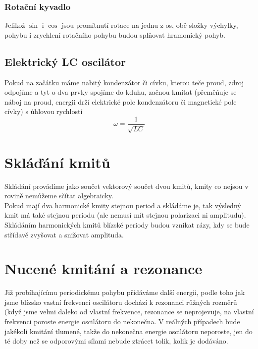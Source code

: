 \documentclass[titlepage]{book}
\begin{document}
\subsubsection{Rotační kyvadlo}
Jelikož $\sin$ i $\cos$ jsou promítnutí rotace na jednu z os, obě složky výchylky, pohybu i zrychlení rotačního pohybu budou splňovat hramonický pohyb.
\subsection{Elektrický LC oscilátor}
Pokud na začátku máme nabitý kondenzátor či cívku, kterou teče proud, zdroj odpojíme a tyt o dva prvky spojíme do kduhu, začnou kmitat (přeměňuje se náboj na proud, energii drží elektrické pole kondenzátoru či magnetické pole cívky) s úhlovou rychlostí\\
\begin{equation}
\omega = \frac{1}{\sqrt{LC}}
\end{equation}
\section{Skláďání kmitů}
Skládání provádíme jako součet vektorový součet dvou kmitů, kmity co nejsou v rovině nemůžeme sčítat algebraicky.\\
Pokud mají dva harmonické kmity stejnou period a skládáme je, tak výsledný kmit má také stejnou periodu (ale nemusí mít stejnou polarizaci ni amplitudu).\\
Skládáním harmonických kmitů blízské periody budou vznikat rázy, kdy se bude střídavě zvyšovat a snižovat amplituda.
\section{Nucené kmitání a rezonance}
Již probíhajícímu periodickému pohybu přidáváme další energii, podle toho jak jsme blízsko vastní frekvenci oscilátoru dochází k rezonanci růžných rozměrů (když jsme velmi daleko od vlastní frekvence, rezonance se neprojevuje, na vlastní frekvenci poroste energie oscilátoru do nekonečna. V reálných případech bude jakékoli kmitání tlumené, takže do nekonečna energie oscilátoru neporoste, jen do té doby než se odporovými sílami nebude ztrácet tolik, kolik je dodáváno.
\end{document}

